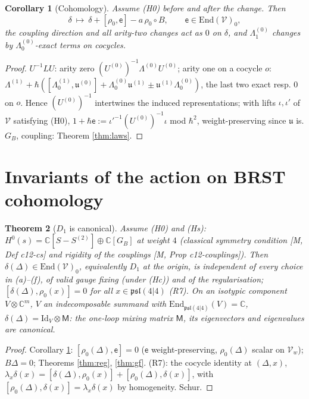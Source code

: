 \documentclass[10pt]{article}
\newtheorem{theorem}{Theorem}[section]
\newtheorem{corollary}[theorem]{Corollary}
\theoremstyle{definition}
\newcommand{\pl}{\mathfrak{psl}(4|4)}
\newcommand{\V}{\mathcal V}
\newcommand{\End}{\mathrm{End}}
\newcommand{\ee}{\mathsf e}
\begin{document}
\begin{corollary}[Cohomology]\label{cor:coh}
Assume (H0) before and after the change. Then
\[
\delta\ \longmapsto\ \delta+[\rho_0,\ee]-a\,\rho_0\circ B,\qquad \ee\in\End(\V)_0,
\]
the coupling direction and all arity-two changes act as $0$ on $\delta$, and $\Lambda_1^{(0)}$ changes by $\Lambda_0^{(0)}$-exact terms on cocycles.
\end{corollary}
\begin{proof}
$U^{-1}LU$: arity zero $(U^{(0)})^{-1}\Lambda^{(0)}U^{(0)}$; arity one on a cocycle $o$: $\Lambda^{(1)}+\hbar([\Lambda_0^{(1)},\mathfrak u^{(0)}]+\Lambda_0^{(0)}\mathfrak u^{(1)}\pm\mathfrak u^{(1)}\Lambda_0^{(0)})$, the last two exact resp. $0$ on $o$. Hence $(U^{(0)})^{-1}$ intertwines the induced representations; with lifts $\iota,\iota'$ of $\V$ satisfying (H0), $1+\hbar\ee:=\iota'^{-1}(U^{(0)})^{-1}\iota$ mod $\hbar^2$, weight-preserving since $\mathfrak u$ is. $G_B$, coupling: Theorem \ref{thm:laws}.
\end{proof}

\section{Invariants of the action on BRST cohomology}

\begin{theorem}[$D_1$ is canonical]\label{thm:D1}
Assume (H0) and (Hs): $H^0(s)=\mathbb C[S-S^{(2)}]\oplus\mathbb C[G_B]$ at weight $4$ (classical symmetry condition [M, Def c12-cs] and rigidity of the couplings [M, Prop c12-couplings]). Then $\delta(\Delta)\in\End(\V)_0$, equivalently $D_1$ at the origin, is independent of every choice in (a)--(f), of valid gauge fixing (under (Hc)) and of the regularisation; $[\delta(\Delta),\rho_0(x)]=0$ for all $x\in\pl$ (R7). On an isotypic component $V\otimes\mathbb C^m$, $V$ an indecomposable summand with $\End_{\pl}(V)=\mathbb C$, $\delta(\Delta)=\mathrm{Id}_V\otimes\mathsf M$: the one-loop mixing matrix $\mathsf M$, its eigenvectors and eigenvalues are canonical.
\end{theorem}
\begin{proof}
Corollary \ref{cor:coh}: $[\rho_0(\Delta),\ee]=0$ ($\ee$ weight-preserving, $\rho_0(\Delta)$ scalar on $\V_w$); $B\Delta=0$; Theorems \ref{thm:reg}, \ref{thm:gf}. (R7): the cocycle identity at $(\Delta,x)$, $\lambda_x\delta(x)=[\delta(\Delta),\rho_0(x)]+[\rho_0(\Delta),\delta(x)]$, with $[\rho_0(\Delta),\delta(x)]=\lambda_x\delta(x)$ by homogeneity. Schur.
\end{proof}
\end{document}
